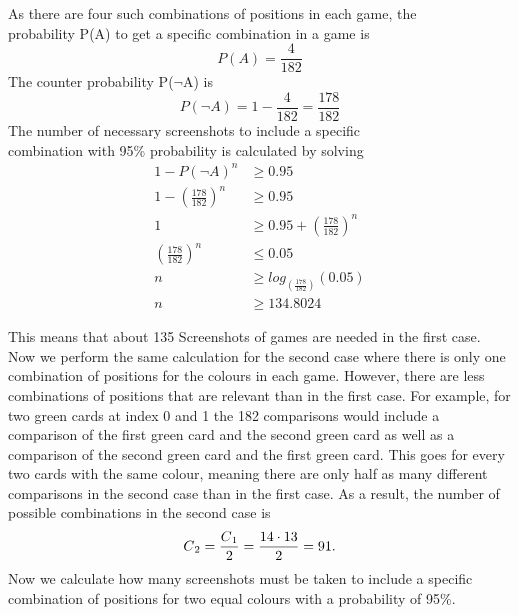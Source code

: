 \begin{center}
	As there are four such combinations of positions in each game, the \\probability P(A) to get a specific combination in a game is 
	\begin{equation*}
	P(A) = \frac{4}{182} %
	\end{equation*}
	The counter probability P($\lnot$A) is 
	\begin{equation*}
	P(\lnot A) = 1 - \frac{4}{182} = \frac{178}{182}%
	\end{equation*}
	The number of necessary screenshots to include a specific \\combination with 95\% probability is calculated by solving
	\begin{align*}
	1 - P(\lnot A)^n &\geq 0.95 \\
	1 - \left(\frac{178}{182}\right)^n &\geq 0.95 \\
	1 &\geq 0.95 + \left(\frac{178}{182}\right)^n\\
	\left(\frac{178}{182}\right)^n &\leq 0.05\\
	n &\geq log_{(\frac{178}{182})}(0.05) \\
	n &\geq 134.8024 %
	\end{align*}
\end{center}
This means that about 135 Screenshots of games are needed in the first case. Now we perform the same calculation for the second case where there is only one combination of positions for the colours in each game. However, there are less combinations of positions that are relevant than in the first case. For example, for two green cards at index 0 and 1 the 182 comparisons would include a comparison of the first green card and the second green card as well as a comparison of the second green card and the first green card. This goes for every two cards with the same colour, meaning there are only half as many different comparisons in the second case than in the first case. As a result, the number of possible combinations in the second case is
\begin{equation*}
C\textsubscript{2} = \frac{C\textsubscript{1}}{2} = \frac{14 \cdot 13}{2} = 91.
\end{equation*}
Now we calculate how many screenshots must be taken to include a specific combination of positions for two equal colours with a probability of 95\%. 

